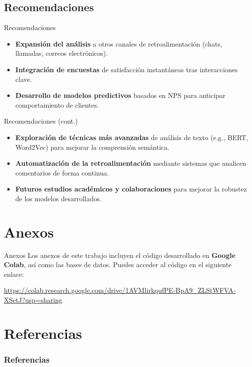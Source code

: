 \documentclass[aspectratio=169, xcolor={dvipsnames}, 10pt, spanish]{beamer}
\begin{document}
\subsection{Recomendaciones}
\begin{frame}{Recomendaciones}
    \begin{itemize}
        \item \textbf{Expansión del análisis} a otros canales de retroalimentación (chats, llamadas, correos electrónicos).
        \item \textbf{Integración de encuestas} de satisfacción instantáneas tras interacciones clave.
        \item \textbf{Desarrollo de modelos predictivos} basados en NPS para anticipar comportamiento de clientes.
    \end{itemize}
\end{frame}

\begin{frame}{Recomendaciones (cont.)}
    \begin{itemize}
        \item \textbf{Exploración de técnicas más avanzadas} de análisis de texto (e.g., BERT, Word2Vec) para mejorar la comprensión semántica.
        \item \textbf{Automatización de la retroalimentación} mediante sistemas que analicen comentarios de forma continua.
        \item \textbf{Futuros estudios académicos y colaboraciones} para mejorar la robustez de los modelos desarrollados.
    \end{itemize}
\end{frame}

\section*{Anexos}
\begin{frame}{Anexos}
    Los anexos de este trabajo incluyen el código desarrollado en \textbf{Google Colab}, así como las bases de datos. Puedes acceder al código en el siguiente enlace:

    \vfill
    \url{https://colab.research.google.com/drive/1AVMlirkqufPE-BpA9_ZLStWFVA-XSetJ?usp=sharing}
\end{frame}

\section*{Referencias}
\begin{frame}[allowframebreaks]
    \frametitle{Referencias}
    \footnotesize
    \printbibliography
\end{frame}
\end{document}
